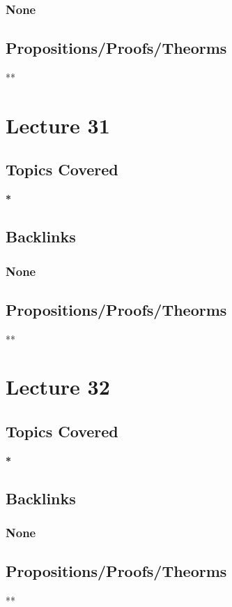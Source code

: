 \documentclass[11pt]{article}
\begin{document}
\subsubsection*{None}
\label{sec:org969b4c0}
\subsection*{Propositions/Proofs/Theorms}
\label{sec:org27764e9}
**

\section*{Lecture 31}
\label{sec:orge896424}
\subsection*{Topics Covered}
\label{sec:org69268a5}
\textbf{*}
\subsection*{Backlinks}
\label{sec:org9ecac84}
\subsubsection*{None}
\label{sec:org3f23b02}
\subsection*{Propositions/Proofs/Theorms}
\label{sec:org125c598}
**

\section*{Lecture 32}
\label{sec:orgb3d0358}
\subsection*{Topics Covered}
\label{sec:org42c50ab}
\textbf{*}
\subsection*{Backlinks}
\label{sec:org54b92d6}
\subsubsection*{None}
\label{sec:orged94b4c}
\subsection*{Propositions/Proofs/Theorms}
\label{sec:orgcca6956}
**
\end{document}
